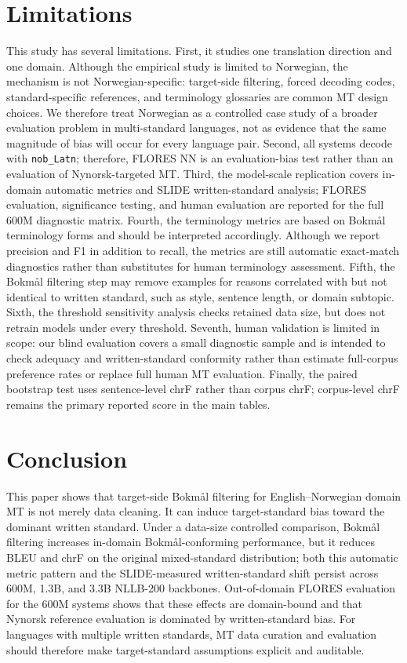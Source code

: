 \documentclass[11pt]{article}
\newcommand{\nb}{Bokm{\aa}l}
\newcommand{\nn}{Nynorsk}
\begin{document}
\section{Limitations}

This study has several limitations. First, it studies one translation direction and one domain. Although the empirical study is limited to Norwegian, the mechanism is not Norwegian-specific: target-side filtering, forced decoding codes, standard-specific references, and terminology glossaries are common MT design choices. We therefore treat Norwegian as a controlled case study of a broader evaluation problem in multi-standard languages, not as evidence that the same magnitude of bias will occur for every language pair. Second, all systems decode with \texttt{nob\_Latn}; therefore, FLORES NN is an evaluation-bias test rather than an evaluation of \nn{}-targeted MT. Third, the model-scale replication covers in-domain automatic metrics and SLIDE written-standard analysis; FLORES evaluation, significance testing, and human evaluation are reported for the full 600M diagnostic matrix. Fourth, the terminology metrics are based on \nb{} terminology forms and should be interpreted accordingly. Although we report precision and F1 in addition to recall, the metrics are still automatic exact-match diagnostics rather than substitutes for human terminology assessment. Fifth, the \nb{} filtering step may remove examples for reasons correlated with but not identical to written standard, such as style, sentence length, or domain subtopic. Sixth, the threshold sensitivity analysis checks retained data size, but does not retrain models under every threshold. Seventh, human validation is limited in scope: our blind evaluation covers a small diagnostic sample and is intended to check adequacy and written-standard conformity rather than estimate full-corpus preference rates or replace full human MT evaluation. Finally, the paired bootstrap test uses sentence-level chrF rather than corpus chrF; corpus-level chrF remains the primary reported score in the main tables.

\section{Conclusion}

This paper shows that target-side \nb{} filtering for English--Norwegian domain MT is not merely data cleaning. It can induce target-standard bias toward the dominant written standard. Under a data-size controlled comparison, \nb{} filtering increases in-domain \nb{}-conforming performance, but it reduces BLEU and chrF on the original mixed-standard distribution; both this automatic metric pattern and the SLIDE-measured written-standard shift persist across 600M, 1.3B, and 3.3B NLLB-200 backbones. Out-of-domain FLORES evaluation for the 600M systems shows that these effects are domain-bound and that \nn{} reference evaluation is dominated by written-standard bias. For languages with multiple written standards, MT data curation and evaluation should therefore make target-standard assumptions explicit and auditable.
\end{document}
